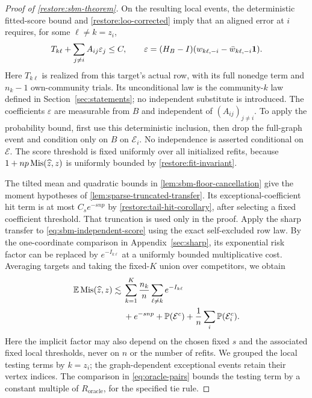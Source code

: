 \begin{proof}[Proof of \cref{restore:sbm-theorem}]
On the resulting local events, the deterministic fitted-score
bound and \cref{restore:loo-corrected} imply that an aligned error
at $i$ requires, for some $\ell\ne k=z_i$,
\begin{equation}\label{eq:sbm-independent-score}
 T_{k\ell}+\sum_{j\ne i}A_{ij}\varepsilon_j\le C,
 \qquad \varepsilon=(H_B-I)(w_{k\ell,-i}-\bar w_{k\ell,-i}\mathbf 1).
\end{equation}
Here $T_{k\ell}$ is realized from this target's actual row, with its
full nonedge term and $n_k-1$ own-community trials. Its unconditional
law is the community-$k$ law defined in Section~\ref{sec:statements};
no independent substitute is introduced. The coefficients $\varepsilon$
are measurable from $B$ and independent of $(A_{ij})_{j\ne i}$. To apply the probability
bound, first use this deterministic inclusion, then drop the
full-graph event and condition only on $B$ on $\mathcal E_i$.
No independence is asserted conditional on $\mathcal E$.
The score threshold is fixed uniformly over all initialized refits,
because $1+np\operatorname{Mis}(\widehat z,z)$ is uniformly bounded by
\cref{restore:fit-invariant}.

The tilted mean and quadratic bounds in
\cref{lem:sbm-floor-cancellation} give the moment hypotheses of
\cref{lem:sparse-truncated-transfer}. Its exceptional-coefficient
hit term is at most $C_se^{-s{np}}$ by
\cref{restore:tail-hit-corollary}, after selecting a fixed
coefficient threshold. That truncation is used only in the proof.
Apply the sharp transfer to \eqref{eq:sbm-independent-score} using
the exact self-excluded row law. By the one-coordinate comparison in
Appendix~\ref{sec:sharp}, its exponential risk factor can be replaced
by $e^{-I_{k\ell}}$ at a uniformly bounded multiplicative cost.
Averaging targets and taking the fixed-$K$ union over competitors,
we obtain
\begin{equation}\label{eq:sbm-final-payment}
 \begin{split}
 \mathbb E\operatorname{Mis}(\widehat z,z)
 \lesssim{}&\sum_{k=1}^K\frac{n_k}{n}
                     \sum_{\ell\ne k}e^{-I_{k\ell}}\\
 &+e^{-snp}
       +\mathbb P(\mathcal E^c)+\frac1n\sum_i\mathbb P(\mathcal E_i^c).
 \end{split}
\end{equation}
Here the implicit factor may also depend on the chosen fixed
$s$ and the associated fixed local thresholds, never on $n$ or the
number of refits. We grouped the local testing terms by $k=z_i$;
the graph-dependent exceptional events retain their vertex indices.
The comparison in \eqref{eq:oracle-pairs} bounds the testing term by
a constant multiple of $R_{\mathrm{oracle}}$, for the specified tie rule.


\end{proof}
